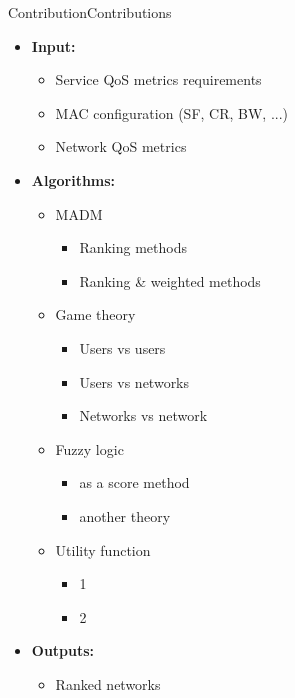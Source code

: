\begin{frame}{Contribution}{Contributions}
{\begin{itemize}
			\item \textbf{Input:}
			\begin{itemize}
				\item Service QoS metrics requirements
				\item MAC configuration (SF, CR, BW, ...)
				\item Network QoS metrics
			\end{itemize}
		\end{itemize}
	}{
	\begin{itemize}
		\item \textbf{Algorithms:}
		\begin{itemize}
			\item MADM
			\begin{itemize}
				\item Ranking methods
				\item Ranking \& weighted methods
			\end{itemize}
			\item Game theory
			\begin{itemize}
				\item Users vs users
				\item Users vs networks
				\item Networks vs network
			\end{itemize}
			\item Fuzzy logic
			\begin{itemize}
				\item as a score method
				\item another theory
			\end{itemize}
			\item Utility function
			\begin{itemize}
				\item 1
				\item 2
			\end{itemize}
		\end{itemize}

		\item \textbf{Outputs:}
		\begin{itemize}
			\item Ranked networks
		\end{itemize}
	\end{itemize}
}


\end{frame}

